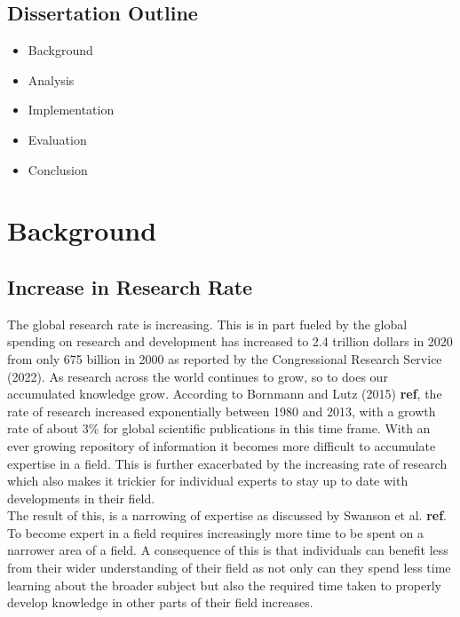 \documentclass{l4proj}
\begin{document}
\section{Dissertation Outline}
\begin{itemize}
    \item Background
    \item Analysis
    \item Implementation
    \item Evaluation
    \item Conclusion
\end{itemize}

\chapter{Background}

\section{Increase in Research Rate}

The global research rate is increasing. This is in part fueled by the global spending on research and development has increased to 2.4 trillion dollars in 2020 from only 675 billion in 2000 as reported by the Congressional Research Service (2022). As research across the world continues to grow, so to does our accumulated knowledge grow. According to Bornmann and Lutz (2015) \textbf{ref}, the rate of research increased exponentially between 1980 and 2013, with a growth rate of about 3\% for global scientific publications in this time frame. With an ever growing repository of information it becomes more difficult to accumulate expertise in a field. This is further exacerbated by the increasing rate of research which also makes it trickier for individual experts to stay up to date with developments in their field. \\ 

The result of this, is a narrowing of expertise as discussed by Swanson et al. \textbf{ref}. To become expert in a field requires increasingly more time to be spent on a narrower area of a field. A consequence of this is that individuals can benefit less from their wider understanding of their field as not only can they spend less time learning about the broader subject but also the required time taken to properly develop knowledge in other parts of their field increases.\\ 
\end{document}
